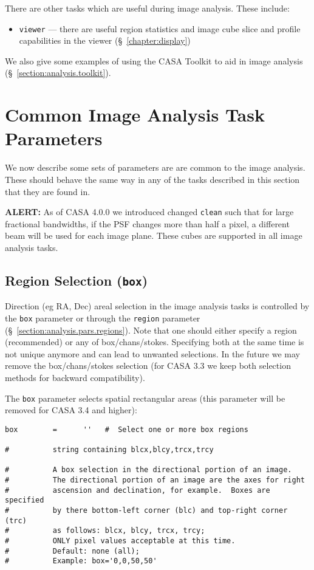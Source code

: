 There are other tasks which are useful during image analysis.  These
include:
\begin{itemize}
   \item {\tt viewer} --- there are useful region statistics and
         image cube slice and profile capabilities in the viewer 
         (\S~\ref{chapter:display})
\end{itemize}

We also give some examples of using the CASA Toolkit to aid in
image analysis (\S~\ref{section:analysis.toolkit}).

\section{Common Image Analysis Task Parameters}
\label{section:analysis.pars}

We now describe some sets of parameters are are common to the image
analysis.  These should behave the same way in any of the tasks
described in this section that they are found in.  

{\bf ALERT:} As of CASA 4.0.0 we introduced changed {\tt clean} such
that for large fractional bandwidths, if the PSF changes more than
half a pixel, a different beam will be used for each image
plane. These cubes are supported in all image analysis tasks.  

\subsection{Region Selection ({\tt box})}
\label{section:analysis.pars.box}

Direction (eg RA, Dec) areal selection in the image analysis tasks is
controlled by the {\tt box} parameter or through the {\tt region}
parameter (\S~\ref{section:analysis.pars.regions}). Note that one
should either specify a region (recommended) or any of
box/chans/stokes. Specifying both at the same time is not unique
anymore and can lead to unwanted selections. In the future we may
remove the box/chans/stokes selection (for CASA 3.3 we 
keep both selection methods for backward compatibility).

The {\tt box} parameter selects spatial rectangular areas (this parameter will
be removed for CASA 3.4 and higher):
\small
\begin{verbatim}
box        =      ''   #  Select one or more box regions

#          string containing blcx,blcy,trcx,trcy

#          A box selection in the directional portion of an image.
#          The directional portion of an image are the axes for right
#          ascension and declination, for example.  Boxes are specified
#          by there bottom-left corner (blc) and top-right corner (trc)
#          as follows: blcx, blcy, trcx, trcy;
#          ONLY pixel values acceptable at this time.
#          Default: none (all);
#          Example: box='0,0,50,50'


\end{verbatim}
\normalsize

